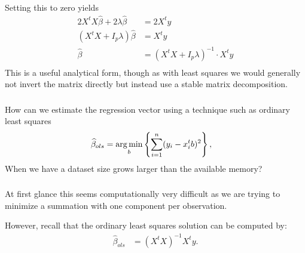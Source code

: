 \documentclass[xetex,mathserif,serif,aspectratio=169]{beamer}
\begin{document}
\begin{frame}[fragile] \frametitle{} \oldB \small

Setting this to zero yields
\begin{align*}
2 X^t X \widehat{\beta} + 2 \lambda \widehat{\beta} &= 2 X^t y \\
(X^t X + I_p \lambda) \widehat{\beta} &=  X^t y \\
\widehat{\beta} &= (X^t X + I_p \lambda)^{-1} \cdot X^t y \\
\end{align*}
\pause This is a useful analytical form, though as with least
squares we would generally not invert the matrix directly but
instead use a stable matrix decomposition.

\end{frame}


\begin{frame}[fragile] \frametitle{} \oldB \small

\textbf{}

How can we estimate the regression vector using a technique
such as ordinary least squares
\begin{align*}
\widehat{\beta}_{ols} &= \mathop{\mathrm{arg\,min}}_b \left\{ \sum_{i=1}^n (y_i - x_i^t b)^2 \right\},
\end{align*}
When we have a dataset size grows larger than the available memory?

\end{frame}

\begin{frame}[fragile] \frametitle{} \oldB \small

At first glance this seems computationally very difficult
as we are trying to minimize a summation with one component
per observation.

However, recall that the ordinary least squares solution
can be computed by:
\begin{align*}
\widehat{\beta}_{ols} &= (X^t X)^{-1} X^t y.
\end{align*}

\end{frame}
\end{document}

